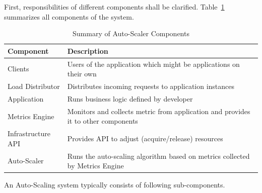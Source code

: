 First, responsibilities of different components shall be clarified. Table~\ref{tab:auto-scaler-sum} summarizes all components of the system.
\begin{table}[h!]
    \begin{tabular}{ll}
        \toprule
        \textbf{Component} & \textbf{Description}\\
        \midrule
        Clients & Users of the application which might be applications on their own\\
        Load Distributor & Distributes incoming requests to application instances\\
        Application & Runs business logic defined by developer\\
        Metrics Engine & Monitors and collects metric from application and provides it to other components\\
        Infrastructure API & Provides API to adjust (acquire/release) resources\\
        Auto-Scaler & Runs the auto-scaling algorithm based on metrics collected by Metrics Engine\\
        \bottomrule
    \end{tabular}
    \centering
    \caption{Summary of Auto-Scaler Components}
    \label{tab:auto-scaler-sum}
\end{table}
An Auto-Scaling system typically consists of following sub-components.
